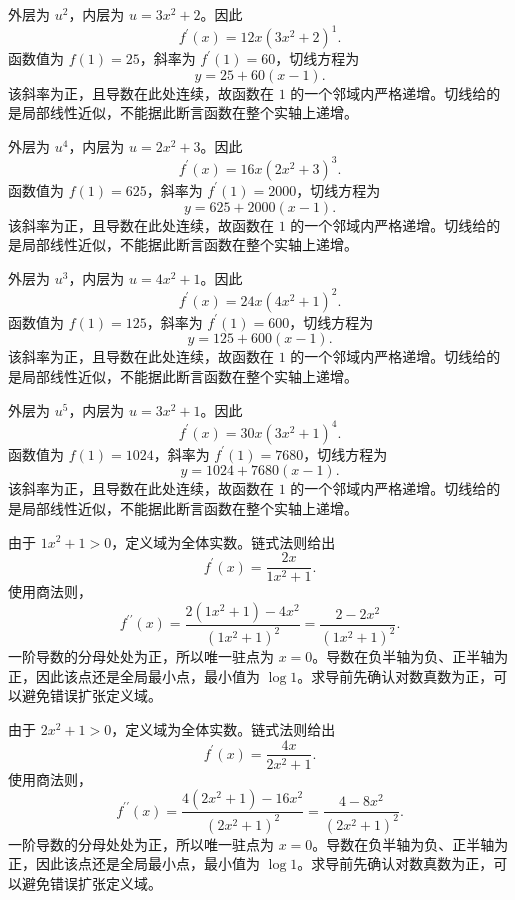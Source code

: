 \documentclass[UTF8,12pt,a4paper,fontset=fandol]{ctexart}
\begin{document}
\begin{solve}\label{ans:c8q9}
外层为 $u^{2}$，内层为 $u=3x^2+2$。因此
\[
f^{\prime}(x)=12x(3x^2+2)^{1}.
\]
函数值为 $f(1)=25$，斜率为 $f^{\prime}(1)=60$，切线方程为
\[
y=25+60(x-1).
\]
该斜率为正，且导数在此处连续，故函数在 $1$ 的一个邻域内严格递增。切线给的是局部线性近似，不能据此断言函数在整个实轴上递增。
\end{solve}

\begin{solve}\label{ans:c8q10}
外层为 $u^{4}$，内层为 $u=2x^2+3$。因此
\[
f^{\prime}(x)=16x(2x^2+3)^{3}.
\]
函数值为 $f(1)=625$，斜率为 $f^{\prime}(1)=2000$，切线方程为
\[
y=625+2000(x-1).
\]
该斜率为正，且导数在此处连续，故函数在 $1$ 的一个邻域内严格递增。切线给的是局部线性近似，不能据此断言函数在整个实轴上递增。
\end{solve}

\begin{solve}\label{ans:c8q11}
外层为 $u^{3}$，内层为 $u=4x^2+1$。因此
\[
f^{\prime}(x)=24x(4x^2+1)^{2}.
\]
函数值为 $f(1)=125$，斜率为 $f^{\prime}(1)=600$，切线方程为
\[
y=125+600(x-1).
\]
该斜率为正，且导数在此处连续，故函数在 $1$ 的一个邻域内严格递增。切线给的是局部线性近似，不能据此断言函数在整个实轴上递增。
\end{solve}

\begin{solve}\label{ans:c8q12}
外层为 $u^{5}$，内层为 $u=3x^2+1$。因此
\[
f^{\prime}(x)=30x(3x^2+1)^{4}.
\]
函数值为 $f(1)=1024$，斜率为 $f^{\prime}(1)=7680$，切线方程为
\[
y=1024+7680(x-1).
\]
该斜率为正，且导数在此处连续，故函数在 $1$ 的一个邻域内严格递增。切线给的是局部线性近似，不能据此断言函数在整个实轴上递增。
\end{solve}

\begin{solve}\label{ans:c8q13}
由于 $1x^2+1>0$，定义域为全体实数。链式法则给出
\[
f^{\prime}(x)=\frac{2x}{1x^2+1}.
\]
使用商法则，
\[
f^{\prime\prime}(x)=\frac{2(1x^2+1)-4x^2}{(1x^2+1)^2}=\frac{2-2x^2}{(1x^2+1)^2}.
\]
一阶导数的分母处处为正，所以唯一驻点为 $x=0$。导数在负半轴为负、正半轴为正，因此该点还是全局最小点，最小值为 $\log 1$。求导前先确认对数真数为正，可以避免错误扩张定义域。
\end{solve}

\begin{solve}\label{ans:c8q14}
由于 $2x^2+1>0$，定义域为全体实数。链式法则给出
\[
f^{\prime}(x)=\frac{4x}{2x^2+1}.
\]
使用商法则，
\[
f^{\prime\prime}(x)=\frac{4(2x^2+1)-16x^2}{(2x^2+1)^2}=\frac{4-8x^2}{(2x^2+1)^2}.
\]
一阶导数的分母处处为正，所以唯一驻点为 $x=0$。导数在负半轴为负、正半轴为正，因此该点还是全局最小点，最小值为 $\log 1$。求导前先确认对数真数为正，可以避免错误扩张定义域。
\end{solve}
\end{document}
